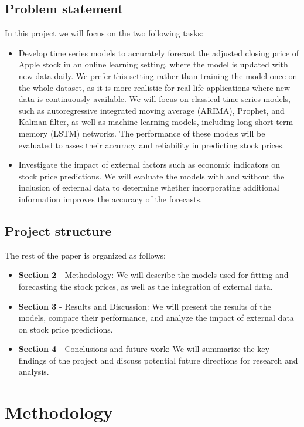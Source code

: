 \documentclass[12pt]{article}
\theoremstyle{definition}
\begin{document}
\subsection{Problem statement}
In this project we will focus on the two following tasks:
\begin{itemize}
  \item Develop time series models to accurately forecast the adjusted closing price of Apple stock in an online learning setting, where the model is updated with new data daily. 
  We prefer this setting rather than training the model once on the whole dataset, as it is more realistic for real-life applications where new data is continuously available. 
  We will focus on classical time series models, such as autoregressive integrated moving average (ARIMA), Prophet, and Kalman filter, as well as machine learning models, including long short-term memory (LSTM) networks. 
  The performance of these models will be evaluated to asses their accuracy and reliability in predicting stock prices.
  \item Investigate the impact of external factors such as economic indicators on stock price predictions. 
  We will evaluate the models with and without the inclusion of external data to determine whether incorporating additional information improves the accuracy of the forecasts.
\end{itemize}

\subsection{Project structure}
The rest of the paper is organized as follows:
\begin{itemize}
  \item \textbf{Section 2} - Methodology: We will describe the models used for fitting and forecasting the stock prices, as well as the integration of external data.
  \item \textbf{Section 3} - Results and Discussion: We will present the results of the models, compare their performance, and analyze the impact of external data on stock price predictions.
  \item \textbf{Section 4} - Conclusions and future work: We will summarize the key findings of the project and discuss potential future directions for research and analysis.
\end{itemize}


\section{Methodology}
\end{document}
